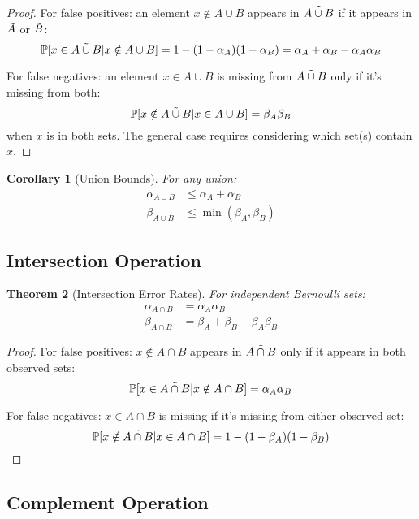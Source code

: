 \documentclass[11pt]{article}
\newtheorem{theorem}{Theorem}[section]
\newtheorem{corollary}[theorem]{Corollary}
\begin{document}
\begin{proof}
For false positives: an element $x \notin A \cup B$ appears in $\tilde{A \cup B}$ if it appears in $\tilde{A}$ or $\tilde{B}$:
\[
\mathbb{P}[x \in \tilde{A \cup B} | x \notin A \cup B] = 1 - (1-\alpha_A)(1-\alpha_B) = \alpha_A + \alpha_B - \alpha_A\alpha_B
\]

For false negatives: an element $x \in A \cup B$ is missing from $\tilde{A \cup B}$ only if it's missing from both:
\[
\mathbb{P}[x \notin \tilde{A \cup B} | x \in A \cup B] = \beta_A \beta_B
\]
when $x$ is in both sets. The general case requires considering which set(s) contain $x$.
\end{proof}

\begin{corollary}[Union Bounds]
For any union:
\begin{align}
\alpha_{A \cup B} &\leq \alpha_A + \alpha_B \\
\beta_{A \cup B} &\leq \min(\beta_A, \beta_B)
\end{align}
\end{corollary}

\subsection{Intersection Operation}

\begin{theorem}[Intersection Error Rates]
For independent Bernoulli sets:
\begin{align}
\alpha_{A \cap B} &= \alpha_A \alpha_B \\
\beta_{A \cap B} &= \beta_A + \beta_B - \beta_A \beta_B
\end{align}
\end{theorem}

\begin{proof}
For false positives: $x \notin A \cap B$ appears in $\tilde{A \cap B}$ only if it appears in both observed sets:
\[
\mathbb{P}[x \in \tilde{A \cap B} | x \notin A \cap B] = \alpha_A \alpha_B
\]

For false negatives: $x \in A \cap B$ is missing if it's missing from either observed set:
\[
\mathbb{P}[x \notin \tilde{A \cap B} | x \in A \cap B] = 1 - (1-\beta_A)(1-\beta_B)
\]
\end{proof}

\subsection{Complement Operation}
\end{document}
